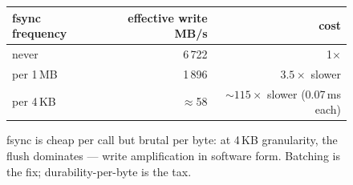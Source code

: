 \begin{figure}[htbp]
\centering
\begin{tabular}{lrr}
\toprule
fsync frequency & effective write MB/s & cost \\
\midrule
never & 6\,722 & 1$\times$ \\
per 1\,MB & 1\,896 & $3.5\times$ slower \\
per 4\,KB & $\approx$58 & $\sim$$115\times$ slower (0.07\,ms each) \\
\bottomrule
\end{tabular}
\caption{fsync is cheap per call but brutal per byte: at 4\,KB
granularity, the flush dominates --- write amplification in
software form. Batching is the fix; durability-per-byte is the
tax.}
\label{fig:fsync14}
\end{figure}
